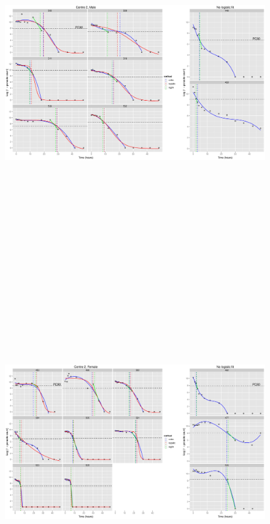 \begin{singlespace}
\begin{figure}
\end{figure}
\begin{figure}
\includegraphics[height=150mm]{Afits2M.eps}
\end{figure}
\begin{figure}
\includegraphics[height=150mm]{Afits2F.eps}
\end{figure}


\end{singlespace}
